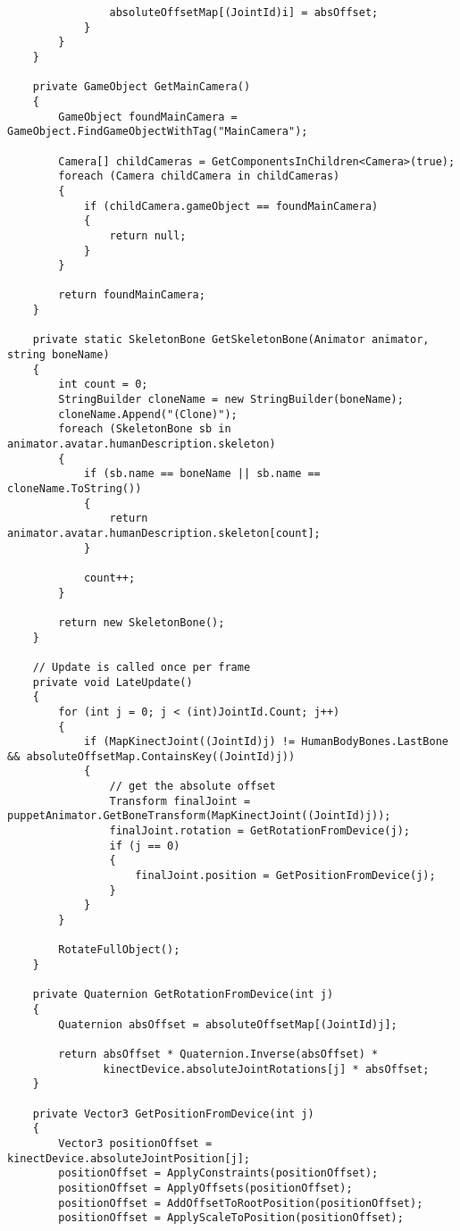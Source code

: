 \begin{verbatim}
                absoluteOffsetMap[(JointId)i] = absOffset;
            }
        }
    }

    private GameObject GetMainCamera()
    {
        GameObject foundMainCamera = GameObject.FindGameObjectWithTag("MainCamera");

        Camera[] childCameras = GetComponentsInChildren<Camera>(true);
        foreach (Camera childCamera in childCameras)
        {
            if (childCamera.gameObject == foundMainCamera)
            {
                return null;
            }
        }

        return foundMainCamera;
    }

    private static SkeletonBone GetSkeletonBone(Animator animator, string boneName)
    {
        int count = 0;
        StringBuilder cloneName = new StringBuilder(boneName);
        cloneName.Append("(Clone)");
        foreach (SkeletonBone sb in animator.avatar.humanDescription.skeleton)
        {
            if (sb.name == boneName || sb.name == cloneName.ToString())
            {
                return animator.avatar.humanDescription.skeleton[count];
            }

            count++;
        }

        return new SkeletonBone();
    }

    // Update is called once per frame
    private void LateUpdate()
    {
        for (int j = 0; j < (int)JointId.Count; j++)
        {
            if (MapKinectJoint((JointId)j) != HumanBodyBones.LastBone && absoluteOffsetMap.ContainsKey((JointId)j))
            {
                // get the absolute offset
                Transform finalJoint = puppetAnimator.GetBoneTransform(MapKinectJoint((JointId)j));
                finalJoint.rotation = GetRotationFromDevice(j);
                if (j == 0)
                {
                    finalJoint.position = GetPositionFromDevice(j);
                }
            }
        }

        RotateFullObject();
    }

    private Quaternion GetRotationFromDevice(int j)
    {
        Quaternion absOffset = absoluteOffsetMap[(JointId)j];

        return absOffset * Quaternion.Inverse(absOffset) *
               kinectDevice.absoluteJointRotations[j] * absOffset;
    }

    private Vector3 GetPositionFromDevice(int j)
    {
        Vector3 positionOffset = kinectDevice.absoluteJointPosition[j];
        positionOffset = ApplyConstraints(positionOffset);
        positionOffset = ApplyOffsets(positionOffset);
        positionOffset = AddOffsetToRootPosition(positionOffset);
        positionOffset = ApplyScaleToPosition(positionOffset);


\end{verbatim}
